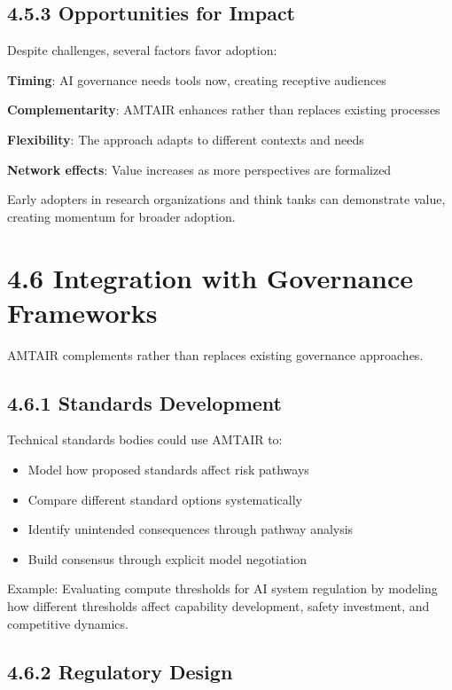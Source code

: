 \documentclass[
  11pt,
  letterpaper,
  openany]{book}
\providecommand{\tightlist}{%
  \setlength{\itemsep}{0pt}\setlength{\parskip}{0pt}}
\begin{document}
\subsection{4.5.3 Opportunities for
Impact}\label{sec-impact-opportunities}

Despite challenges, several factors favor adoption:

\textbf{Timing}: AI governance needs tools now, creating receptive
audiences

\textbf{Complementarity}: AMTAIR enhances rather than replaces existing
processes

\textbf{Flexibility}: The approach adapts to different contexts and
needs

\textbf{Network effects}: Value increases as more perspectives are
formalized

Early adopters in research organizations and think tanks can demonstrate
value, creating momentum for broader adoption.

\section{4.6 Integration with Governance
Frameworks}\label{sec-governance-integration}

AMTAIR complements rather than replaces existing governance approaches.

\subsection{4.6.1 Standards
Development}\label{sec-standards-integration}

Technical standards bodies could use AMTAIR to:

\begin{itemize}
\tightlist
\item
  Model how proposed standards affect risk pathways
\item
  Compare different standard options systematically
\item
  Identify unintended consequences through pathway analysis
\item
  Build consensus through explicit model negotiation
\end{itemize}

Example: Evaluating compute thresholds for AI system regulation by
modeling how different thresholds affect capability development, safety
investment, and competitive dynamics.

\subsection{4.6.2 Regulatory Design}\label{sec-regulatory-integration}
\end{document}
